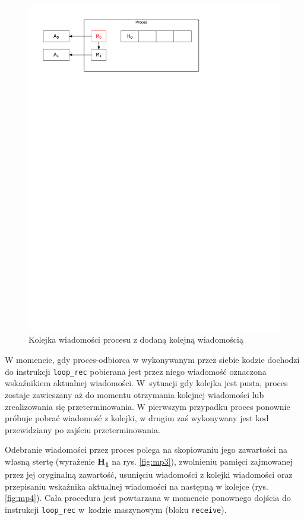\begin{figure}[h]
\centerline{\includegraphics[scale=0.75, clip, trim=10mm 220mm 68mm 10mm]{mp2}}
\caption{Kolejka wiadomości procesu z dodaną kolejną wiadomością}
\label{fig:mp2}
\end{figure}

W momencie, gdy proces-odbiorca w wykonywanym przez siebie kodzie dochodzi do instrukcji \texttt{loop\_rec} pobierana jest przez niego wiadomość oznaczona wskaźnikiem aktualnej wiadomości. W~sytuacji gdy kolejka jest pusta, proces zostaje zawieszany aż do momentu otrzymania kolejnej wiadomości lub zrealizowania się przeterminowania.
W pierwszym przypadku proces ponownie próbuje pobrać wiadomość z kolejki, w drugim zaś wykonywany jest kod przewidziany po zajściu przeterminowania.

Odebranie wiadomości przez proces polega na skopiowaniu jego zawartości na własną stertę (wyrażenie \textbf{H\textsubscript{1}} na rys. \ref{fig:mp3}), zwolnieniu pamięci zajmowanej przez jej oryginalną zawartość, usunięciu wiadomości z kolejki wiadomości oraz przepisaniu wskaźnika aktualnej wiadomości na następną w kolejce (rys. \ref{fig:mp4}).
Cała procedura jest powtarzana w momencie ponownego dojścia do instrukcji \texttt{loop\_rec} w~kodzie maszynowym (bloku \texttt{receive}).

